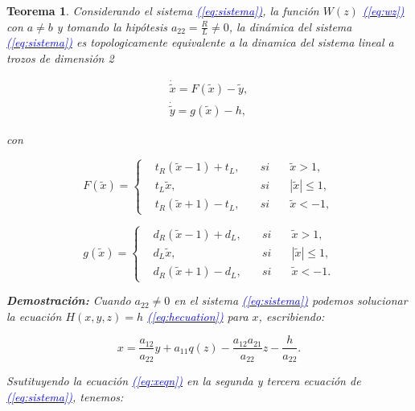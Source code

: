 \documentclass[12pt,a4paper]{report} %
\newtheorem{theorem}{Teorema}[chapter]
\newcommand{\eref}[1]{\hyperref[#1]{\textcolor{blue}{\textit{(\ref*{#1})}}}}
\begin{document}
	\begin{theorem}
		Considerando el sistema \eref{eq:sistema}, la función $W(z)$ \eref{eq:wz} con $a\neq b$ y tomando la hipótesis $a_{22}=\frac{R}{L}\neq 0$, la dinámica del sistema \eref{eq:sistema} es topologicamente equivalente a la dinamica del sistema lineal a trozos de dimensión 2
		
		\begin{equation}
			\label{eq:sis2ec}
			\begin{gathered}
				\dot{\tilde{x}}=F(\tilde{x})-\tilde{y}, \\[2mm]
				\dot{\tilde{y}}=g(\tilde{x})-h,
			\end{gathered}
		\end{equation}
		
		con
		
		\begin{equation}
			\label{eq:f1}
			F(\tilde{x})=
			\left\{
			\begin{aligned}
				&t_R(\tilde{x}-1)+t_L, \quad &si& \quad \tilde{x}>1,\\
				&t_L\tilde{x}, &si& \quad |\tilde{x}|\leq 1,\\
				&t_R(\tilde{x}+1)-t_L, \quad &si& \quad \tilde{x}<-1,
			\end{aligned}
			\right.
		\end{equation}\smallskip
		
		\begin{equation}
			\label{eq:g1}
			g(\tilde{x})=
			\left\{
			\begin{aligned}
				&d_R(\tilde{x}-1)+d_L, \quad &si& \quad \tilde{x}>1,\\
				&d_L\tilde{x}, &si& \quad |\tilde{x}|\leq 1,\\
				&d_R(\tilde{x}+1)-d_L, \quad &si& \quad \tilde{x}<-1.
			\end{aligned}
			\right.
		\end{equation}\smallskip
		
		\vspace{0.5cm}\noindent \textbf{Demostración:} Cuando $a_{22}\neq0$ en el sistema \eref{eq:sistema} podemos solucionar la ecuación $H(x,y,z)=h$ \eref{eq:hecuation} para $x$, escribiendo:
		
		\begin{equation}
			\label{eq:xeqn}
			x=\frac{a_{12}}{a_{22}}y+a_{11}q(z)-\frac{a_{12}a_{21}}{a_{22}}z-\frac{h}{a_{22}}.
		\end{equation}\smallskip
		
		Ssutituyendo la ecuación \eref{eq:xeqn} en la segunda y tercera ecuación de \eref{eq:sistema}, tenemos:
		

\end{theorem}
\end{document}
